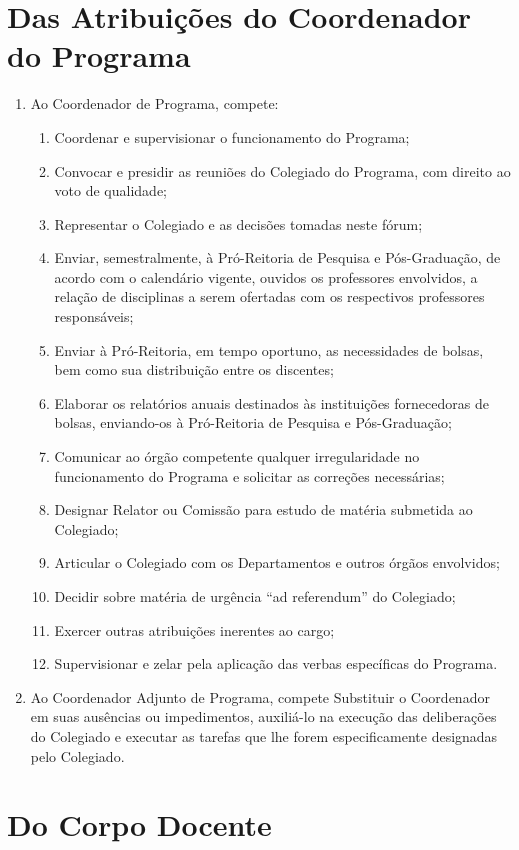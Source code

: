 \documentclass{article}
\begin{document}
\section{Das Atribuições do Coordenador do Programa}
\begin{enumerate}
	\item Ao Coordenador de Programa, compete:
	\begin{enumerate}[label=\Roman*]
		\item Coordenar e supervisionar o funcionamento do Programa;
		\item Convocar e presidir as reuniões do Colegiado do Programa, com direito ao voto de qualidade;
		\item Representar o Colegiado e as decisões tomadas neste fórum;
		\item Enviar, semestralmente, à Pró-Reitoria de Pesquisa e Pós-Graduação, de acordo com o calendário vigente, ouvidos os professores envolvidos, a relação de disciplinas a serem ofertadas com os respectivos professores responsáveis;
		\item Enviar à Pró-Reitoria, em tempo oportuno, as necessidades de bolsas, bem como sua distribuição entre os discentes;
		\item Elaborar os relatórios anuais destinados às instituições fornecedoras de bolsas, enviando-os à Pró-Reitoria de Pesquisa e Pós-Graduação;
		\item Comunicar ao órgão competente qualquer irregularidade no funcionamento do Programa e solicitar as correções necessárias;
		\item Designar Relator ou Comissão para estudo de matéria submetida ao Colegiado;
		\item Articular o Colegiado com os Departamentos e outros órgãos envolvidos;
		\item Decidir sobre matéria de urgência ``ad referendum'' do Colegiado;
		\item Exercer outras atribuições inerentes ao cargo;
		\item Supervisionar e zelar pela aplicação das verbas específicas do Programa.
	\end{enumerate}
	\item Ao Coordenador Adjunto de Programa, compete Substituir o Coordenador em suas ausências ou impedimentos, auxiliá-lo na execução das deliberações do Colegiado e executar as tarefas que lhe forem especificamente designadas pelo Colegiado.
\end{enumerate}

\section{Do Corpo Docente}
\end{document}
